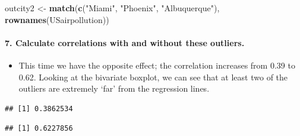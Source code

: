 \documentclass[
]{article}
\newenvironment{Shaded}{\begin{snugshade}}{\end{snugshade}}
\newcommand{\KeywordTok}[1]{\textcolor[rgb]{0.13,0.29,0.53}{\textbf{#1}}}
\newcommand{\NormalTok}[1]{#1}
\newcommand{\OperatorTok}[1]{\textcolor[rgb]{0.81,0.36,0.00}{\textbf{#1}}}
\newcommand{\StringTok}[1]{\textcolor[rgb]{0.31,0.60,0.02}{#1}}
\providecommand{\tightlist}{%
  \setlength{\itemsep}{0pt}\setlength{\parskip}{0pt}}
\begin{document}
\begin{Shaded}
\begin{Highlighting}[]
\NormalTok{outcity2 <-}\StringTok{ }\KeywordTok{match}\NormalTok{(}\KeywordTok{c}\NormalTok{(}\StringTok{"Miami"}\NormalTok{, }\StringTok{"Phoenix"}\NormalTok{, }\StringTok{"Albuquerque"}\NormalTok{),}
                 \KeywordTok{rownames}\NormalTok{(USairpollution))}
\end{Highlighting}
\end{Shaded}

\hypertarget{calculate-correlations-with-and-without-these-outliers.-1}{%
\paragraph{\texorpdfstring{\textbf{7. Calculate correlations with and
without these
outliers.}}{7. Calculate correlations with and without these outliers.}}\label{calculate-correlations-with-and-without-these-outliers.-1}}

\begin{itemize}
\tightlist
\item
  This time we have the opposite effect; the correlation increases from
  0.39 to 0.62. Looking at the bivariate boxplot, we can see that at
  least two of the outliers are extremely `far' from the regression
  lines.
\end{itemize}

\begin{Shaded}
\end{Shaded}

\begin{verbatim}
## [1] 0.3862534
\end{verbatim}

\begin{Shaded}
\end{Shaded}

\begin{verbatim}
## [1] 0.6227856
\end{verbatim}
\end{document}
